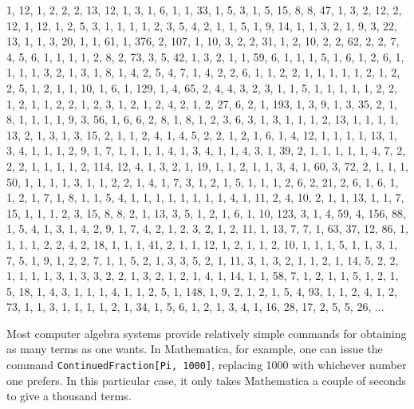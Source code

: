 \documentclass[12pt]{article}
\begin{document}
1, 12, 1, 2, 2, 2, 13, 12, 1, 3, 1, 6, 1, 1, 33, 1, 5, 3, 1, 5, 15, 8, 8, 47, 1, 3, 2, 12, 2, 12, 1, 12, 1, 2, 5, 3, 1, 1, 1, 1, 2, 3, 5, 4, 2, 1, 1, 5, 1, 9, 14, 1, 1, 3, 2, 1, 9, 3, 22, 13, 1, 1, 3, 20, 1, 1, 61, 1, 376, 2, 107, 1, 10, 3, 2, 2, 31, 1, 2, 10, 2, 2, 62, 2, 2, 7, 4, 5, 6, 1, 1, 1, 1, 2, 8, 2, 73, 3, 5, 42, 1, 3, 2, 1, 1, 59, 6, 1, 1, 1, 5, 1, 6, 1, 2, 6, 1, 1, 1, 1, 3, 2, 1, 3, 1, 8, 1, 4, 2, 5, 4, 7, 1, 4, 2, 2, 6, 1, 1, 2, 2, 1, 1, 1, 1, 1, 2, 1, 2, 2, 5, 1, 2, 1, 1, 10, 1, 6, 1, 129, 1, 4, 65, 2, 4, 4, 3, 2, 3, 1, 1, 5, 1, 1, 1, 1, 1, 2, 2, 1, 2, 1, 1, 2, 2, 1, 2, 3, 1, 2, 1, 2, 4, 2, 1, 2, 27, 6, 2, 1, 193, 1, 3, 9, 1, 3, 35, 2, 1, 8, 1, 1, 1, 1, 9, 3, 56, 1, 6, 6, 2, 8, 1, 8, 1, 2, 3, 6, 3, 1, 3, 1, 1, 1, 2, 13, 1, 1, 1, 1, 13, 2, 1, 3, 1, 3, 15, 2, 1, 1, 2, 4, 1, 4, 5, 2, 2, 1, 2, 1, 6, 1, 4, 12, 1, 1, 1, 1, 13, 1, 3, 4, 1, 1, 1, 2, 9, 1, 7, 1, 1, 1, 1, 4, 1, 3, 4, 1, 1, 4, 3, 1, 39, 2, 1, 1, 1, 1, 1, 4, 7, 2, 2, 2, 1, 1, 1, 1, 2, 114, 12, 4, 1, 3, 2, 1, 19, 1, 1, 2, 1, 1, 3, 4, 1, 60, 3, 72, 2, 1, 1, 1, 50, 1, 1, 1, 1, 3, 1, 1, 2, 2, 1, 4, 1, 7, 3, 1, 2, 1, 5, 1, 1, 1, 2, 6, 2, 21, 2, 6, 1, 6, 1, 1, 2, 1, 7, 1, 8, 1, 1, 5, 4, 1, 1, 1, 1, 1, 1, 1, 1, 4, 1, 11, 2, 4, 10, 2, 1, 1, 13, 1, 1, 7, 15, 1, 1, 1, 2, 3, 15, 8, 8, 2, 1, 13, 3, 5, 1, 2, 1, 6, 1, 10, 123, 3, 1, 4, 59, 4, 156, 88, 1, 5, 4, 1, 3, 1, 4, 2, 9, 1, 7, 4, 2, 1, 2, 3, 2, 1, 2, 11, 1, 13, 7, 7, 1, 63, 37, 12, 86, 1, 1, 1, 1, 2, 2, 4, 2, 18, 1, 1, 1, 41, 2, 1, 1, 12, 1, 2, 1, 1, 2, 10, 1, 1, 1, 5, 1, 1, 3, 1, 7, 5, 1, 9, 1, 2, 2, 7, 1, 1, 5, 2, 1, 3, 3, 5, 2, 1, 11, 3, 1, 3, 2, 1, 1, 2, 1, 14, 5, 2, 2, 1, 1, 1, 1, 3, 1, 3, 3, 2, 2, 1, 3, 2, 1, 2, 1, 4, 1, 14, 1, 1, 58, 7, 1, 2, 1, 1, 5, 1, 2, 1, 5, 18, 1, 4, 3, 1, 1, 1, 4, 1, 1, 2, 5, 1, 148, 1, 9, 2, 1, 2, 1, 5, 4, 93, 1, 1, 2, 4, 1, 2, 73, 1, 1, 3, 1, 1, 1, 1, 2, 1, 34, 1, 5, 6, 1, 2, 1, 3, 4, 1, 16, 28, 17, 2, 5, 5, 26, ...

Most computer algebra systems provide relatively simple commands for obtaining as many terms as one wants. In Mathematica, for example, one can issue the command \verb=ContinuedFraction[Pi, 1000]=, replacing 1000 with whichever number one prefers. In this particular case, it only takes Mathematica a couple of seconds to give a thousand terms.
\end{document}
